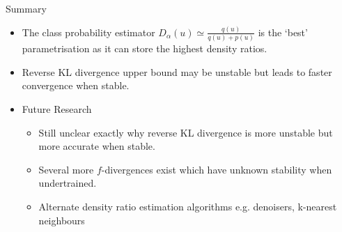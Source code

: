 \documentclass[handout]{beamer}
\begin{document}
\begin{frame}{Summary}
  \begin{itemize}
  \item
    The class probability estimator $D_\alpha(u)\simeq\frac{q(u)}{q(u)+p(u)}$ is the `best' parametrisation as it can store the \alert{highest density ratios}.
  \item
    Reverse KL divergence upper bound may be \alert{unstable} but leads to \alert{faster convergence} when stable.
  \end{itemize}
  
  \begin{itemize}
  \item
    Future Research
    \begin{itemize}
    \item
      Still unclear exactly why reverse KL divergence is more unstable but more accurate when stable.
    \item
      Several more $f$-divergences exist which have unknown stability when undertrained.
    \item Alternate density ratio estimation algorithms e.g. denoisers, k-nearest neighbours
    \end{itemize}
  \end{itemize}
\end{frame}
\end{document}
